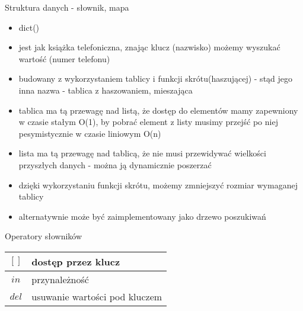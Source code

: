 \begin{frame}{Struktura danych - słownik, mapa}
    \begin{itemize}
        \item dict() \\
        \item jest jak książka telefoniczna, znając klucz (nazwisko) możemy wyszukać wartość (numer telefonu) \\
        \item budowany z wykorzystaniem tablicy i funkcji skrótu(haszującej) - stąd jego inna nazwa - tablica
        z haszowaniem, mieszająca \\
        \item tablica ma tą przewagę nad listą, że dostęp do elementów mamy zapewniony w czasie stałym O(1),
        by pobrać element z listy musimy przejść po niej pesymistycznie w czasie liniowym O(n) \\
        \item lista ma tą przewagę nad tablicą, że nie musi przewidywać wielkości przyszłych danych - można
        ją dynamicznie poszerzać \\
        \item dzięki wykorzystaniu funkcji skrótu, możemy zmniejszyć rozmiar wymaganej tablicy \\
        \item alternatywnie może być zaimplementowany jako drzewo poszukiwań
    \end{itemize}
\end{frame}

\begin{frame}{Operatory słowników}
    \begin{table}
        \centering
        \begin{tabular}{|c|l|}
            \hline
            $[]$ & dostęp przez klucz \\
            \hline
            $in$ & przynależność \\
            \hline
            $del$ & usuwanie wartości pod kluczem \\
            \hline
        \end{tabular}
    \end{table}
\end{frame}

